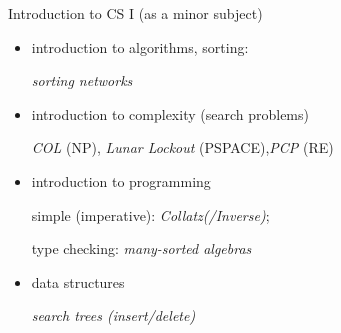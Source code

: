 \begin{slide}{Introduction to CS I (as a minor subject)}

\begin{itemize}
\item
  introduction to algorithms, sorting:

  \emph{sorting networks}
\item
  introduction to complexity (search problems)

  \emph{COL} (NP), \emph{Lunar Lockout} (PSPACE),\emph{PCP} (RE)
\item
  introduction to programming

  simple (imperative): \emph{Collatz(/Inverse)};

  type checking: \emph{many-sorted algebras}
\item
  data structures
  
  \emph{search trees (insert/delete)}
\end{itemize}

\end{slide}







